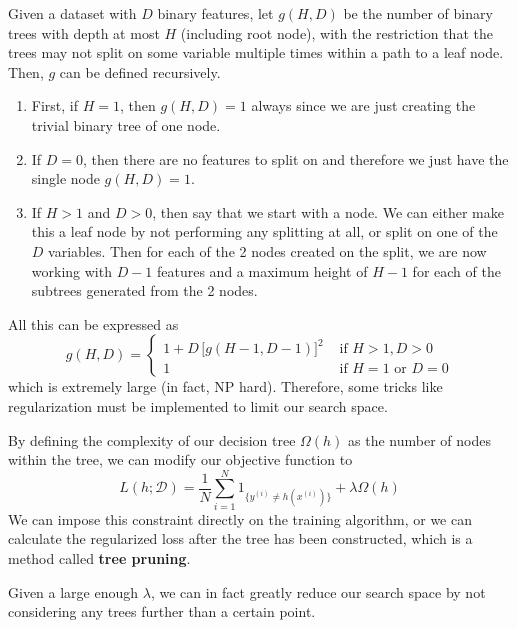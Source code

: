 \documentclass{article}
\theoremstyle{definition}
\theoremstyle{remark}
\theoremstyle{definition}
\begin{document}
Given a dataset with $D$ binary features, let $g(H, D)$ be the number of binary trees with depth at most $H$ (including root node), with the restriction that the trees may not split on some variable multiple times within a path to a leaf node. Then, $g$ can be defined recursively. 
\begin{enumerate}
    \item First, if $H = 1$, then $g(H, D) = 1$ always since we are just creating the trivial binary tree of one node. 
    \item If $D = 0$, then there are no features to split on and therefore we just have the single node $g(H, D) = 1$. 
    \item If $H > 1$ and $D > 0$, then say that we start with a node. We can either make this a leaf node by not performing any splitting at all, or split on one of the $D$ variables. Then for each of the 2 nodes created on the split, we are now working with $D-1$ features and a maximum height of $H-1$ for each of the subtrees generated from the 2 nodes. 
\end{enumerate}
All this can be expressed as 
\[g(H, D) = \begin{cases} 1 + D \, \big[ g(H - 1, D - 1) \big]^2 & \text{ if } H > 1, D > 0 \\ 1 & \text{ if } H = 1 \text{ or } D = 0 \end{cases} \]
which is extremely large (in fact, NP hard). Therefore, some tricks like regularization must be implemented to limit our search space. 

By defining the complexity of our decision tree $\Omega(h)$ as the number of nodes within the tree, we can modify our objective function to 
\[L(h; \mathcal{D}) = \frac{1}{N} \sum_{i=1}^N 1_{\{y^{(i)} \neq h(x^{(i)})\}} + \lambda \Omega(h)\]
We can impose this constraint directly on the training algorithm, or we can calculate the regularized loss after the tree has been constructed, which is a method called \textbf{tree pruning}. 

Given a large enough $\lambda$, we can in fact greatly reduce our search space by not considering any trees further than a certain point. 
\end{document}
